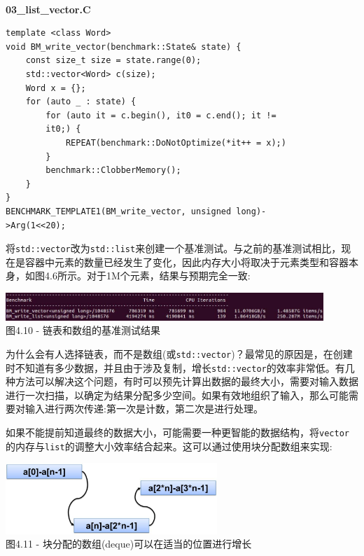\hspace*{\fill} \\ %
\noindent
\textbf{03\_list\_vector.C}
\begin{lstlisting}[style=styleCXX]
template <class Word>
void BM_write_vector(benchmark::State& state) {
	const size_t size = state.range(0);
	std::vector<Word> c(size);
	Word x = {};
	for (auto _ : state) {
		for (auto it = c.begin(), it0 = c.end(); it !=
		it0;) {
			REPEAT(benchmark::DoNotOptimize(*it++ = x);)
		}
		benchmark::ClobberMemory();
	}
}
BENCHMARK_TEMPLATE1(BM_write_vector, unsigned long)-
>Arg(1<<20);
\end{lstlisting}

将\texttt{std::vector}改为\texttt{std::list}来创建一个基准测试。与之前的基准测试相比，现在是容器中元素的数量已经发生了变化，因此内存大小将取决于元素类型和容器本身，如图4.6所示。对于1M个元素，结果与预期完全一致:

\begin{center}
\includegraphics[width=0.9\textwidth]{content/1/chapter4/images/10.jpg}\\
图4.10 - 链表和数组的基准测试结果
\end{center}

为什么会有人选择链表，而不是数组(或\texttt{std::vector})？最常见的原因是，在创建时不知道有多少数据，并且由于涉及复制，增长\texttt{std::vector}的效率非常低。有几种方法可以解决这个问题，有时可以预先计算出数据的最终大小，需要对输入数据进行一次扫描，以确定为结果分配多少空间。如果有效地组织了输入，那么可能需要对输入进行两次传递:第一次是计数，第二次是进行处理。

如果不能提前知道最终的数据大小，可能需要一种更智能的数据结构，将\texttt{vector}的内存与\texttt{list}的调整大小效率结合起来。这可以通过使用块分配数组来实现:

\begin{center}
\includegraphics[width=0.6\textwidth]{content/1/chapter4/images/11.jpg}\\
图4.11 - 块分配的数组(deque)可以在适当的位置进行增长
\end{center}

